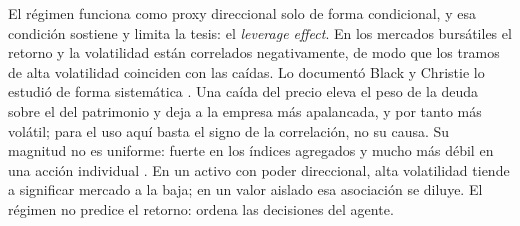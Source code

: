 El régimen funciona como proxy direccional solo de forma condicional, y esa condición sostiene y limita la tesis: el \emph{leverage effect}. En los mercados bursátiles el retorno y la volatilidad están correlados negativamente, de modo que los tramos de alta volatilidad coinciden con las caídas. Lo documentó Black \cite{black1976} y Christie lo estudió de forma sistemática \cite{christie1982}. Una caída del precio eleva el peso de la deuda sobre el del patrimonio y deja a la empresa más apalancada, y por tanto más volátil; para el uso aquí basta el signo de la correlación, no su causa. Su magnitud no es uniforme: fuerte en los índices agregados y mucho más débil en una acción individual \cite{bouchaud2001leverage}. En un activo con poder direccional, alta volatilidad tiende a significar mercado a la baja; en un valor aislado esa asociación se diluye. El régimen no predice el retorno: ordena las decisiones del agente.
